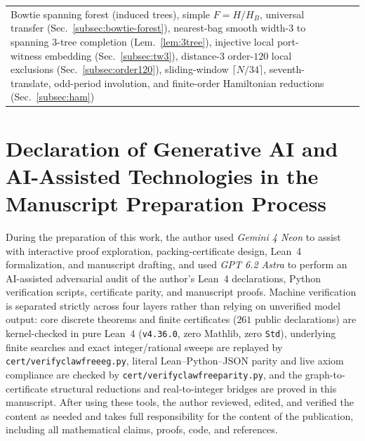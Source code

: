 \documentclass[11pt,reqno]{amsart}
\theoremstyle{plain}
\theoremstyle{definition}
\theoremstyle{remark}
\DeclareRobustCommand{\_}{\ifmmode\text{\textunderscore}\else\textunderscore\allowbreak\fi}
\begin{document}
{\begin{longtable}{@{}>{\raggedright\arraybackslash}p{2.0cm}>{\raggedright\arraybackslash}p{4.6cm}>{\raggedright\arraybackslash}p{4.6cm}>{\raggedright\arraybackslash}p{4.3cm}@{}}
Bowtie spanning forest (induced trees), simple $F = H/H_B$, universal transfer (Sec.~\ref{subsec:bowtie-forest}), nearest-bag smooth width-$3$ to spanning $3$-tree completion (Lem.~\ref{lem:3tree}), injective local port-witness embedding (Sec.~\ref{subsec:tw3}), distance-$3$ order-$120$ local exclusions (Sec.~\ref{subsec:order120}), sliding-window $\lceil N/34 \rceil$, seventh-translate, odd-period involution, and finite-order Hamiltonian reductions (Sec.~\ref{subsec:ham}) \\
\end{longtable}
}

\section*{Declaration of Generative AI and AI-Assisted Technologies in the Manuscript Preparation Process}

During the preparation of this work, the author used \emph{Gemini 4 Neon} to assist with interactive proof exploration, packing-certificate design, Lean~4 formalization, and manuscript drafting, and used \emph{GPT 6.2 Astra} to perform an AI-assisted adversarial audit of the author's Lean~4 declarations, Python verification scripts, certificate parity, and manuscript proofs. Machine verification is separated strictly across four layers rather than relying on unverified model output: core discrete theorems and finite certificates ($261$ public declarations) are kernel-checked in pure Lean~4 (\texttt{v4.36.0}, zero Mathlib, zero \texttt{Std}), underlying finite searches and exact integer/rational sweeps are replayed by \texttt{cert/verify\_clawfree\_eg.py}, literal Lean--Python--JSON parity and live axiom compliance are checked by \texttt{cert/verify\_clawfree\_parity.py}, and the graph-to-certificate structural reductions and real-to-integer bridges are proved in this manuscript. After using these tools, the author reviewed, edited, and verified the content as needed and takes full responsibility for the content of the publication, including all mathematical claims, proofs, code, and references.
\end{document}
